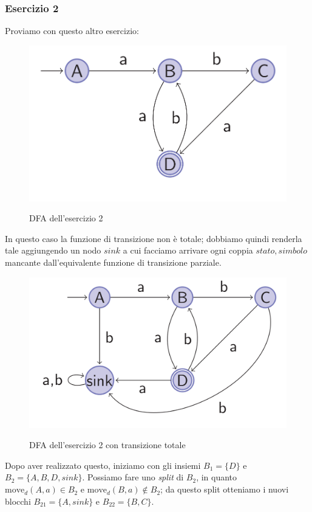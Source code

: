 \documentclass[class=book, crop=false, oneside, 12pt]{standalone}
\begin{document}
\subsubsection{Esercizio 2}
Proviamo con questo altro esercizio:

\begin{figure}[H]
	\centering
	\includegraphics[width=.8\textwidth,keepaspectratio]{dfa_grafo_2.png}
	\label{mindfa-es-2}
	\caption{DFA dell'esercizio 2}
\end{figure}

In questo caso la funzione di transizione non è totale; dobbiamo quindi renderla tale aggiungendo un nodo \(sink\) a cui facciamo arrivare ogni coppia \(stato, simbolo\) mancante dall'equivalente funzione di transizione parziale.

\begin{figure}[H]
	\centering
	\includegraphics[width=.8\textwidth,keepaspectratio]{dfa_grafo_3.png}
	\label{minndfa-es-2-tot}
	\caption{DFA dell'esercizio 2 con transizione totale}
\end{figure}

Dopo aver realizzato questo, iniziamo con gli insiemi \(B_{1}=\{D\}\) e \(B_{2}=\{A,B,D,sink\}\). Possiamo fare uno \emph{split} di \(B_{2}\), in quanto \(\textrm{move}_{d}(A,a) \in B_{2} \) e \(\textrm{move}_{d}(B,a) \notin B_{2} \); da questo split otteniamo i nuovi blocchi \(B_{21}=\{A,sink\}\) e \(B_{22}=\{B,C\}\).
\end{document}

